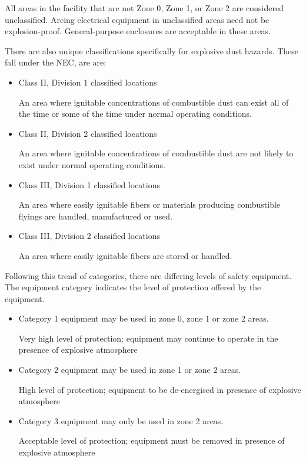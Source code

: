\documentclass[11pt,a4paper]{article}
\begin{document}
\begin{itemize}
All areas in the facility that are not Zone 0, Zone 1, or Zone 2 are considered unclassified. Arcing electrical equipment in unclassified areas need not be explosion-proof. General-purpose enclosures are acceptable in these areas.
\end{itemize}
There are also unique classifications specifically for explosive dust hazards. These fall under the NEC, are are:
\begin{itemize}
    \item Class II, Division 1 classified locations

    An area where ignitable concentrations of combustible dust can exist all of the time or some of the time under normal operating conditions.

    \item Class II, Division 2 classified locations

    An area where ignitable concentrations of combustible dust are not likely to exist under normal operating conditions.

    \item Class III, Division 1 classified locations

    An area where easily ignitable fibers or materials producing combustible flyings are handled, manufactured or used.

    \item Class III, Division 2 classified locations

    An area where easily ignitable fibers are stored or handled.
\end{itemize}
Following this trend of categories, there are differing levels of safety equipment. The equipment category indicates the level of protection offered by the equipment.
\begin{itemize}
      \item   Category 1 equipment may be used in zone 0, zone 1 or zone 2 areas.

      Very high level of protection; equipment may continue to operate in the presence of explosive atmosphere
      \item       Category 2 equipment may be used in zone 1 or zone 2 areas.

      High level of protection; equipment to be de-energised in presence of explosive atmosphere
        \item     Category 3 equipment may only be used in zone 2 areas.

        Acceptable level of protection; equipment must be removed in presence of explosive atmosphere
    \end{itemize}
\end{document}
